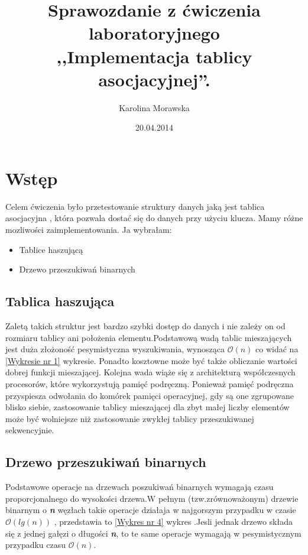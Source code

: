 \documentclass[11pt]{article}
\title{Sprawozdanie z ćwiczenia laboratoryjnego \\,,Implementacja tablicy asocjacyjnej''. }
\author{Karolina Morawska}
\date{20.04.2014}
\begin{document}
\maketitle
\newpage
\section{Wstęp}

Celem ćwiczenia było przetestowanie struktury danych jaką jest tablica asocjacyjna , która pozwala dostać się do danych przy użyciu klucza. Mamy różne mozliwości zaimplementowania. Ja wybrałam:

  \begin{itemize}
  \item Tablice haszującą
  \item Drzewo przeszukiwań binarnych
  \end{itemize}

\subsection{Tablica haszująca}

Zaletą takich struktur jest bardzo szybki dostęp do danych i nie zależy on od rozmiaru tablicy ani położenia elementu.Podstawową wadą tablic mieszających jest duża złożoność pesymistyczna wyszukiwania, wynosząca $\mathcal{O}(n)$ co widać na \ref{Wykresie nr 1} wykresie. Ponadto kosztowne może być także obliczanie wartości dobrej funkcji mieszającej.
Kolejna wada wiąże się z architekturą współczesnych procesorów, które wykorzystują pamięć podręczną. Ponieważ pamięć podręczna przyspiesza odwołania do komórek pamięci operacyjnej, gdy są one zgrupowane blisko siebie, zastosowanie tablicy mieszającej dla zbyt małej liczby elementów może być wolniejsze niż zastosowanie zwykłej tablicy przeszukiwanej sekwencyjnie.
\subsection{Drzewo przeszukiwań binarnych }

Podstawowe operacje na drzewach poszukiwań binarnych wymagają czasu proporcjonalnego do wysokości drzewa.W pełnym (tzw.zrównoważonym) drzewie binarnym o \textbf{\textsl{n}} węzłach takie operacje działaja w najgorszym przypadku w czasie $\mathcal{O}(lg(n))$ , przedstawia to \ref{Wykres nr 4} wykres .Jesli jednak drzewo składa się z jednej gałęzi o długości \textbf{\textsl{n}}, to te same operacje wymagają w pesymistycznym przypadku czasu $\mathcal{O}(n)$.
\end{document}
